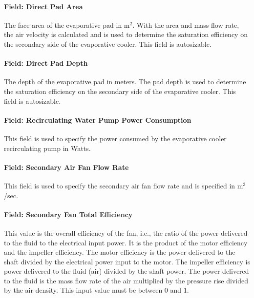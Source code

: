 \paragraph{Field: Direct Pad Area}\label{field-direct-pad-area-1}

The face area of the evaporative pad in m\(^{2}\). With the area and mass flow rate, the air velocity is calculated and is used to determine the saturation efficiency on the secondary side of the evaporative cooler. This field is autosizable.

\paragraph{Field: Direct Pad Depth}\label{field-direct-pad-depth-1}

The depth of the evaporative pad in meters. The pad depth is used to determine the saturation efficiency on the secondary side of the evaporative cooler. This field is autosizable.

\paragraph{Field: Recirculating Water Pump Power Consumption}\label{field-recirculating-water-pump-power-consumption-1}

This field is used to specify the power consumed by the evaporative cooler recirculating pump in Watts.

\paragraph{Field: Secondary Air Fan Flow Rate}\label{field-secondary-air-fan-flow-rate}

This field is used to specify the secondary air fan flow rate and is specified in m\(^{3}\)/sec.

\paragraph{Field: Secondary Fan Total Efficiency}\label{field-secondary-fan-total-efficiency}

This value is the overall efficiency of the fan, i.e., the ratio of the power delivered to the fluid to the electrical input power. It is the product of the motor efficiency and the impeller efficiency. The motor efficiency is the power delivered to the shaft divided by the electrical power input to the motor. The impeller efficiency is power delivered to the fluid (air) divided by the shaft power. The power delivered to the fluid is the mass flow rate of the air multiplied by the pressure rise divided by the air density. This input value must be between 0 and 1.

